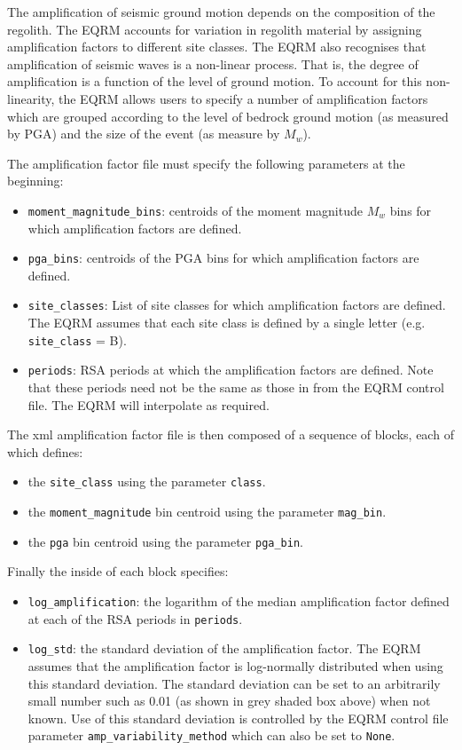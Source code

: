 The amplification of seismic ground motion depends on the composition
of the regolith. The EQRM accounts for variation in regolith material by assigning
amplification factors to different site classes. The EQRM also recognises that
amplification of seismic waves is a non-linear process. That is, the degree
of amplification is a function of the level of ground motion. To account for
this non-linearity, the EQRM allows users to specify a number of amplification
factors which are grouped according to the level of bedrock ground motion (as
measured by PGA) and the size of the event (as measure by $M_w$).

The amplification factor file must specify the following parameters at the beginning:
\begin{itemize}
\item \texttt{moment\_magnitude\_bins}: centroids of the moment magnitude $M_w$ bins
 for which amplification factors are defined.
\item \texttt{pga\_bins}: centroids of the PGA bins for which amplification factors are defined.
\item \texttt{site\_classes}: List of site classes for which amplification factors are defined.
The EQRM assumes that each site class is defined by a single letter (e.g. \texttt{site\_class} = B).
\item \texttt{periods}: RSA periods at which the amplification factors are defined. Note that
these periods need not be the same as those in  from the
EQRM control file. The EQRM will interpolate as required.
\end{itemize}

The xml amplification factor file is then composed of a sequence of blocks, each of which
defines:
\begin{itemize}
\item the \texttt{site\_class} using the parameter \texttt{class}.
\item the \texttt{moment\_magnitude} bin centroid using the parameter \texttt{mag\_bin}.
\item the \texttt{pga} bin centroid using the parameter \texttt{pga\_bin}.
\end{itemize}

Finally the inside of each block specifies:
\begin{itemize}
\item \texttt{log\_amplification}: the logarithm of the median amplification factor defined at each
of the RSA periods in \texttt{periods}.
\item \texttt{log\_std}: the standard deviation of the amplification factor. The EQRM assumes
 that the amplification factor is log-normally
distributed when using this
standard deviation. The standard deviation can be set to an arbitrarily small
number such as 0.01 (as shown in grey shaded box above) when not known. Use of this standard deviation is controlled by
the EQRM control file parameter \texttt{amp\_variability\_method} which can also be set to \texttt{None}.
\end{itemize}
